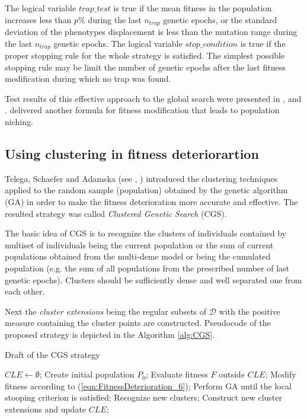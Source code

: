 The logical variable $trap\_test$ is true if
the mean fitness in the population increases less than $p\%$ during the last $n_{trap}$
genetic epochs, or the standard deviation of the 
phenotypes displacement is less than the mutation range during the last $n_{trap}$
genetic epochs.
The logical variable $stop\_condition$ is true if the proper stopping rule for the whole strategy is satisfied. The simplest possible stopping rule may be limit the number of genetic epochs after the last fitness modification during which no trap was found.

Test results of this effective approach to the global search were presented in  \cite{Obuchowicz1999}, \cite{ObuchowiczPatan1997b} and \cite{ObuchowiczKorbicz1999}.
\cite{Arabas2001} delivered another formula for fitness modification that leads to
population niching.














\subsection{Using clustering in fitness deteriorartion}
\label{sec:CGS}



Telega, Schaefer and Adamska (see \cite{Telega1999}, \cite{SchaeferAdamskaTelega2004})
introduced the clustering techniques applied to the random sample (population)
obtained by the genetic algorithm (GA) in order to make the fitness deterioration
more accurate and effective.
The resulted strategy was called \textit{Clustered Genetic Search} (CGS).

The basic idea of CGS is to recognize the clusters of individuals contained by
multiset of individuals being the current population or the sum of current
populations obtained from the multi-deme model or being the cumulated population
(e.g. the sum of all populations from the prescribed number of last genetic epochs).
Clusters should be sufficiently dense and well separated one from each other.

Next the \textit{cluster extensions} being the regular subsets of $\mathcal{D}$
with the positive measure containing the cluster points are constructed.
Pseudocode of the proposed strategy is depicted in the Algorithm \ref{alg:CGS}.
\begin{algorithm}
\caption{Draft of the CGS strategy}
\label{alg:CGS}
\begin{algorithmic}[1]
\STATE $CLE \leftarrow \emptyset$;
\STATE Create initial population $P_0$;
\REPEAT
\STATE Evaluate fitness $F$ outside $CLE$;
\STATE Modify fitness according to (\ref{eqn:FitnessDeterioration_6});
\STATE Perform GA until the local stooping criterion is satisfied;
\STATE Recognize new clusters;
\STATE Construct new cluster extensions and update $CLE$;
\end{algorithmic}
\end{algorithm}

